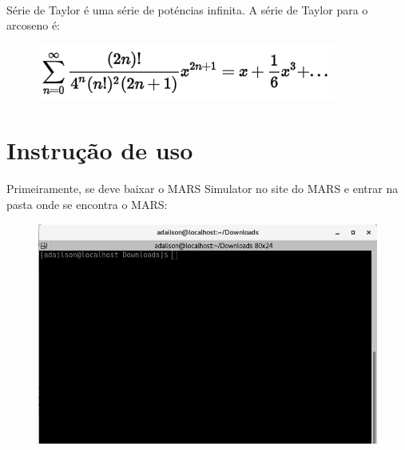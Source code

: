 \documentclass[a4paper, 12pt]{article}
\begin{document}
	\paragraph{}	S\'erie de Taylor \'e uma s\'erie de pot\'encias infinita. A s\'erie de Taylor para o arcoseno \'e:
	\begin{figure}[H]
		\centering
		\includegraphics[scale=0.5]{img10.png}
	\end{figure}
        
\section{Instru\c{c}\~ao de uso}
		\paragraph{}    Primeiramente, se deve baixar o MARS Simulator no site do MARS e entrar na pasta onde se encontra o MARS: 
		\begin{figure}[H]
			\centering
			\includegraphics[scale=0.5]{img1.png}
		\end{figure}
\end{document}
